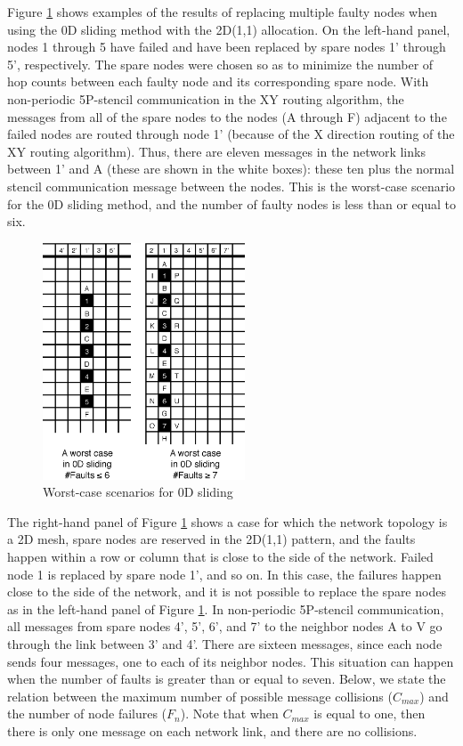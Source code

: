 \documentclass[Afour,times,sagev]{sagej}
\begin{document}
Figure \ref{fig:0d-worst-cases} shows examples of the results of
replacing multiple faulty nodes when using the 0D sliding method with
the 2D(1,1) allocation. On the left-hand panel, nodes 1 through 5 have
failed and have been replaced by spare nodes 1' through 5',
respectively. The spare nodes were chosen so as to minimize the number
of hop counts between each faulty node and its corresponding spare
node. With non-periodic 5P-stencil communication in the XY routing
algorithm, the messages from all of the spare nodes to the nodes (A
through F) adjacent to the failed nodes are routed through node 1'
(because of the X direction routing of the XY routing
algorithm). Thus, there are eleven messages in the network links
between 1' and A  (these are shown in the white boxes): these ten plus
the normal stencil communication message between the nodes. This is
the worst-case scenario for the 0D sliding method, and the number of
faulty nodes is less than or equal to six.

\begin{figure}[ht]
\centering
\includegraphics[width=60mm]{Figs/0D-WorstCases.eps}
  \caption{Worst-case scenarios for 0D sliding}
  \label{fig:0d-worst-cases}
\end{figure}

The right-hand panel of Figure \ref{fig:0d-worst-cases} shows a case
for which the network topology is a 2D mesh, spare nodes are reserved
in the 2D(1,1) pattern, and the faults happen within a row or column
that is close to the side of the network. Failed node 1 is replaced by
spare node 1', and so on. In this case, the failures happen close to
the side of the network, and it is not possible to replace the spare
nodes as in the left-hand panel of Figure \ref{fig:0d-worst-cases}. In
non-periodic 5P-stencil communication, all messages from spare nodes
4', 5', 6', and 7' to the neighbor nodes A to V go through the link
between 3' and 4'. There are sixteen messages, since each node sends
four messages, one to each of its neighbor nodes. This situation can
happen when the number of faults is greater than or equal to
seven. Below, we state the relation between the maximum number of
possible message collisions ($C_{max}$) and the number of node
failures ($F_n$). Note that when $C_{max}$ is equal to one, then there
is only one message on each network link, and there are no collisions.
\end{document}
